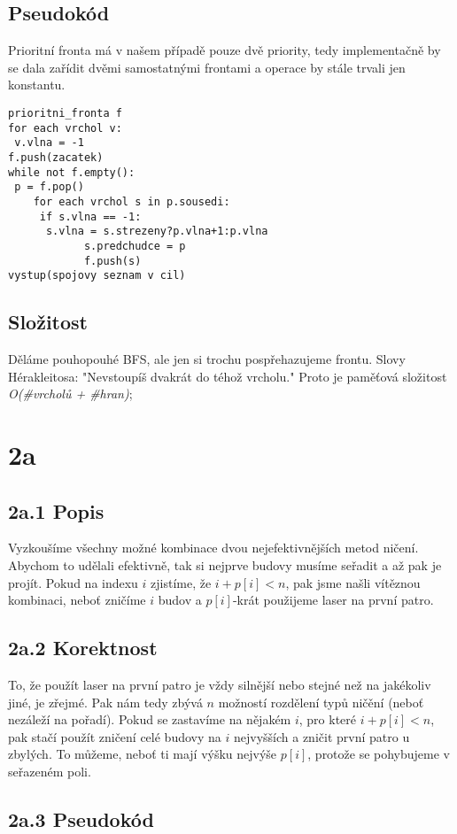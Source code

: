 \documentclass[a4paper]{article}
\begin{document}
\subsection{Pseudokód}
Prioritní fronta má v našem případě pouze dvě priority, tedy implementačně by se dala zařídit dvěmi samostatnými frontami a operace by stále trvali jen konstantu.
\begin{lstlisting}
prioritni_fronta f
for each vrchol v:
 v.vlna = -1
f.push(zacatek)
while not f.empty():
 p = f.pop()
    for each vrchol s in p.sousedi:
     if s.vlna == -1:
      s.vlna = s.strezeny?p.vlna+1:p.vlna
            s.predchudce = p
            f.push(s)
vystup(spojovy seznam v cil)
\end{lstlisting}
\subsection{Složitost}
Děláme pouhopouhé BFS, ale jen si trochu pospřehazujeme frontu. Slovy Hérakleitosa: "Nevstoupíš dvakrát do téhož vrcholu." Proto je paměťová složitost \textit{O(\#vrcholů + \#hran)};
\section*{2a}
\subsection*{2a.1 Popis}
Vyzkoušíme všechny možné kombinace dvou nejefektivnějších metod ničení. Abychom to udělali efektivně, tak si nejprve budovy musíme seřadit a až pak je projít. Pokud na indexu $i$ zjistíme, že $i+p[i] < n$, pak jsme našli vítěznou kombinaci, neboť zničíme $i$ budov a $p[i]$-krát použijeme laser na první patro.
\subsection*{2a.2 Korektnost}
To, že použít laser na první patro je vždy silnější nebo stejné než na jakékoliv jiné, je zřejmé. Pak nám tedy zbývá $n$ možností rozdělení typů ničění (neboť nezáleží na pořadí). Pokud se zastavíme na nějakém $i$, pro které $i+p[i] < n$, pak stačí použít zničení celé budovy na $i$ nejvyšších a zničit první patro u zbylých. To můžeme, neboť ti mají výšku nejvýše $p[i]$, protože se pohybujeme v seřazeném poli.

\subsection*{2a.3 Pseudokód}
\end{document}
